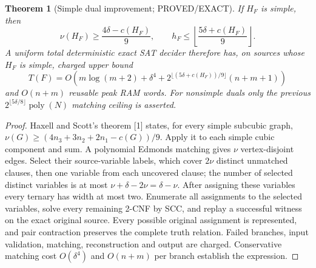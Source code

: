 \documentclass[11pt]{article}
\newtheorem{theorem}{Theorem}
\begin{document}
\begin{theorem}[Simple dual improvement; PROVED/EXACT]
If $H_F$ is \emph{simple}, then
\[
\nu(H_F)\ge\frac{4\delta-c(H_F)}9,\qquad
h_F\le\left\lfloor\frac{5\delta+c(H_F)}9\right\rfloor.
\]
A uniform total deterministic exact SAT decider therefore has, on sources whose $H_F$ is simple, charged upper bound
\[
T(F)=O\!\left(m\log(m+2)+\delta^4+
2^{\lfloor(5\delta+c(H_F))/9\rfloor}(n+m+1)\right)
\]
and $O(n+m)$ reusable peak RAM words. For nonsimple duals only the previous $2^{\lfloor5\delta/8\rfloor}\operatorname{poly}(N)$ matching ceiling is asserted.
\end{theorem}
\begin{proof}
Haxell and Scott's theorem [1] states, for every simple subcubic graph, $\nu(G)\ge(4n_3+3n_2+2n_1-c(G))/9$. Apply it to each simple cubic component and sum. A polynomial Edmonds matching gives $\nu$ vertex-disjoint edges. Select their source-variable labels, which cover $2\nu$ distinct unmatched clauses, then one variable from each uncovered clause; the number of selected distinct variables is at most $\nu+\delta-2\nu=\delta-\nu$. After assigning these variables every ternary has width at most two. Enumerate all assignments to the selected variables, solve every remaining 2-CNF by SCC, and replay a successful witness on the exact original source. Every possible original assignment is represented, and pair contraction preserves the complete truth relation. Failed branches, input validation, matching, reconstruction and output are charged. Conservative matching cost $O(\delta^4)$ and $O(n+m)$ per branch establish the expression.
\end{proof}
\end{document}
